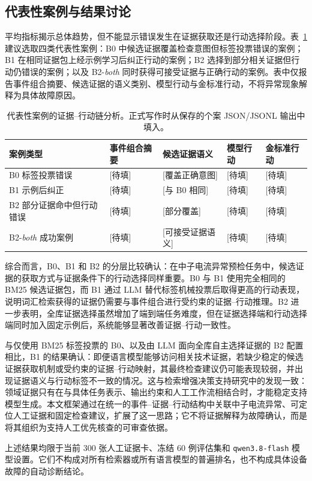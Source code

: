 \subsection{代表性案例与结果讨论}

平均指标揭示总体趋势，但不能显示错误发生在证据获取还是行动选择阶段。表~\ref{tab:case-analysis} 建议选取四类代表性案例：B0 中候选证据覆盖检查意图但标签投票错误的案例；B1 在相同证据包上经示例学习后纠正行动的案例；B2 选择到部分相关证据但行动仍错误的案例；以及 B2-\textit{both} 同时获得可接受证据与正确行动的案例。表中仅报告事件组合摘要、候选证据的语义类别、模型行动与金标准行动，不将异常现象解释为具体故障原因。

\begin{table}[t]
\centering
\caption{代表性案例的证据--行动链分析。正式写作时从保存的个案 JSON/JSONL 输出中填入。}
\label{tab:case-analysis}
\small
\begin{tabular}{p{} p{} p{} p{} p{}}
\hline
案例类型 & 事件组合摘要 & 候选证据语义 & 模型行动 & 金标准行动 \\
\hline
B0 标签投票错误 & [待填] & [覆盖正确意图] & [待填] & [待填] \\
B1 示例后纠正 & [待填] & [与 B0 相同] & [待填] & [待填] \\
B2 部分证据命中但行动错误 & [待填] & [部分覆盖] & [待填] & [待填] \\
B2-\textit{both} 成功案例 & [待填] & [可接受证据语义] & [待填] & [待填] \\
\hline
\end{tabular}
\end{table}

综合而言，B0、B1 和 B2 的分层比较确认：在中子电流异常预检任务中，候选证据的获取方式与证据条件下的行动选择同样重要。B0 与 B1 使用完全相同的 BM25 候选证据包，而 B1 通过 LLM 替代标签机械投票后取得更高的行动表现，说明词汇检索获得的证据仍需要与事件组合进行受约束的证据--行动推理。B2 进一步表明，全库证据选择虽然增加了端到端任务难度，但在证据选择端和行动选择端同时加入固定示例后，系统能够显著改善证据--行动一致性。

与仅使用 BM25 标签投票的 B0、以及由 LLM 面向全库自主选择证据的 B2 配置相比，B1 的结果确认：即便语言模型能够访问相关技术证据，若缺少稳定的候选证据获取机制或受约束的证据--行动映射，其最终检查建议仍可能表现较弱，并出现证据语义与行动标签不一致的情况。这与检索增强决策支持研究中的发现一致：领域证据只有在与具体任务表示、输出约束和人工工作流相结合时，才能稳定支持模型生成。本文框架通过在统一的事件--证据--行动结构中关联中子电流异常、可定位人工证据和固定检查建议，扩展了这一思路；它不将证据解释为故障确认，而是将其组织为支持人工优先核查的可审查依据。

上述结果均限于当前 300 张人工证据卡、冻结 60 例评估集和 \texttt{qwen3.8-flash} 模型设置。它们不构成对所有检索器或所有语言模型的普遍排名，也不构成具体设备故障的自动诊断结论。
